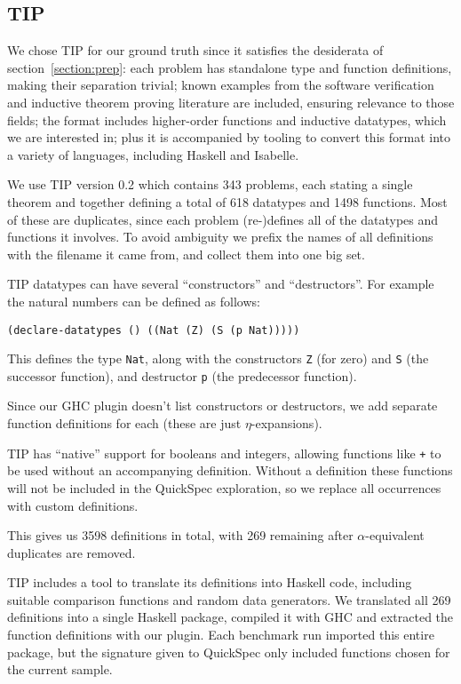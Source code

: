 \subsection{TIP}

We chose TIP for our ground truth since it satisfies the desiderata of
section~\ref{section:prep}: each problem has standalone type and function
definitions, making their separation trivial; known examples from the software
verification and inductive theorem proving literature are included, ensuring
relevance to those fields; the format includes higher-order functions and
inductive datatypes, which we are interested in; plus it is accompanied by
tooling to convert this format into a variety of languages, including Haskell
and Isabelle.

We use TIP version 0.2 which contains 343 problems, each stating a single
theorem and together defining a total of 618 datatypes and 1498 functions. Most
of these are duplicates, since each problem (re-)defines all of the datatypes
and functions it involves. To avoid ambiguity we prefix the names of all
definitions with the filename it came from, and collect them into one big set.

TIP datatypes can have several ``constructors'' and ``destructors''. For example
the natural numbers can be defined as follows:

\begin{verbatim}
(declare-datatypes () ((Nat (Z) (S (p Nat)))))
\end{verbatim}

This defines the type \texttt{Nat}, along with the constructors \texttt{Z} (for
zero) and \texttt{S} (the successor function), and destructor \texttt{p} (the
predecessor function).

Since our GHC plugin doesn't list constructors or destructors, we add separate
function definitions for each (these are just $\eta$-expansions).

TIP has ``native'' support for booleans and integers, allowing functions like
\texttt{+} to be used without an accompanying definition. Without a definition
these functions will not be included in the QuickSpec exploration, so we replace
all occurrences with custom definitions.

This gives us 3598 definitions in total, with 269 remaining after
$\alpha$-equivalent duplicates are removed.

TIP includes a tool to translate its definitions into Haskell code, including
suitable comparison functions and random data generators. We translated all 269
definitions into a single Haskell package, compiled it with GHC and extracted
the function definitions with our plugin. Each benchmark run imported this
entire package, but the signature given to QuickSpec only included functions
chosen for the current sample.

